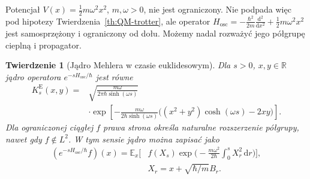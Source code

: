 \documentclass[11pt,a4paper,oneside]{report}
\numberwithin{equation}{chapter}
\theoremstyle{plain}
\newtheorem{twierdzenie}{Twierdzenie}[chapter]
\theoremstyle{definition}
\theoremstyle{remark}
\newcommand{\R}{\mathbb{R}}
\newcommand{\E}{\mathbb{E}}
\newcommand{\dd}{\mathrm{d}}
\begin{document}
Potencjał $V(x)=\frac12 m\omega^2x^2$, $m,\omega>0$,
nie jest ograniczony. Nie podpada więc pod hipotezy
Twierdzenia~\ref{th:QM-trotter}, ale operator
$H_{\mathrm{osc}}=-\frac{\hbar^2}{2m}\frac{\dd^2}{\dd x^2}
+\frac12m\omega^2x^2$ jest samosprzężony i
ograniczony od dołu. Możemy nadal rozważyć jego
półgrupę cieplną i propagator.

\begin{twierdzenie}[Jądro Mehlera w czasie euklidesowym]
\label{th:Mehler-euclidean}
Dla $s>0$, $x,y\in\R$ jądro operatora
$e^{-sH_{\mathrm{osc}}/\hbar}$ jest równe
\[
\begin{split}
 K_s^{\mathrm E}(x,y)
  ={}&\sqrt{\frac{m\omega}{2\pi\hbar\sinh(\omega s)}}\\
 &\cdot\exp\left[-\frac{m\omega}{2\hbar\sinh(\omega s)}
 \bigl((x^2+y^2)\cosh(\omega s)-2xy\bigr)\right].
\end{split}
\tag{16.9}\label{eq:Mehler-E}
\]
Dla ograniczonej ciągłej $f$ prawa strona określa
naturalne rozszerzenie półgrupy, nawet gdy $f\notin L^2$.
W tym sensie jądro można zapisać jako
\[
\begin{split}
 (e^{-sH_{\mathrm{osc}}/\hbar}f)(x)
 =\E_x\Big[&f(X_s)\exp\Big(
  -\frac{m\omega^2}{2\hbar}\int_0^sX_r^2\,\dd r
 \Big)\Big],\\
 &X_r=x+\sqrt{\hbar/m}B_r.
\end{split}
\tag{16.10}\label{eq:Mehler-FK}
\]
\end{twierdzenie}
\end{document}

